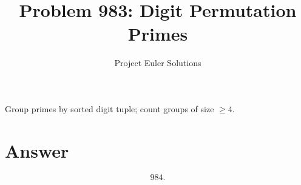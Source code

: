 \documentclass[11pt]{article}
\title{Problem 983: Digit Permutation Primes}
\author{Project Euler Solutions}
\date{}
\begin{document}
\maketitle
Group primes by sorted digit tuple; count groups of size $\ge 4$.
\section{Answer}

\[
\boxed{984.}
\]
\end{document}
